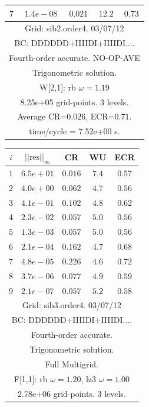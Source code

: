 \begin{table}[hbt]
\begin{center}
{\begin{tabular}{|c|c|c|c|c|}
 $ 7$  & $ 1.4e-08$ & $0.021$ & $12.2$ & $0.73$ \\ 
\hline 
\multicolumn{5}{|c|}{Grid: sib2.order4. 03/07/12}  \\
\multicolumn{5}{|c|}{BC: DDDDDD+IIIIDI+IIIIDI....}  \\
\multicolumn{5}{|c|}{Fourth-order accurate. NO-OP-AVE}  \\
\multicolumn{5}{|c|}{Trigonometric solution.}  \\
\multicolumn{5}{|c|}{W[2,1]: rb $\omega=1.19$}  \\
\multicolumn{5}{|c|}{8.25e+05 grid-points. 3 levels.}  \\
\multicolumn{5}{|c|}{Average CR=$0.026$, ECR=$0.71$.}  \\
\multicolumn{5}{|c|}{time/cycle = 7.52e+00 s.}  \\
\hline 
\end{tabular}
\begin{tabular}{|c|c|c|c|c|} \hline 
 $i$   & $\vert\vert\mbox{res}\vert\vert_\infty$  &  CR     &  WU    & ECR  \\   \hline 
 $ 1$  & $ 6.5e+01$ & $0.016$ & $ 7.4$ & $0.57$ \\ 
 $ 2$  & $ 4.0e+00$ & $0.062$ & $ 4.7$ & $0.56$ \\ 
 $ 3$  & $ 4.1e-01$ & $0.102$ & $ 4.8$ & $0.62$ \\ 
 $ 4$  & $ 2.3e-02$ & $0.057$ & $ 5.0$ & $0.56$ \\ 
 $ 5$  & $ 1.3e-03$ & $0.057$ & $ 5.0$ & $0.56$ \\ 
 $ 6$  & $ 2.1e-04$ & $0.162$ & $ 4.7$ & $0.68$ \\ 
 $ 7$  & $ 4.8e-05$ & $0.226$ & $ 4.6$ & $0.72$ \\ 
 $ 8$  & $ 3.7e-06$ & $0.077$ & $ 4.9$ & $0.59$ \\ 
 $ 9$  & $ 2.1e-07$ & $0.057$ & $ 5.2$ & $0.58$ \\ 
\hline 
\multicolumn{5}{|c|}{Grid: sib3.order4. 03/07/12}  \\
\multicolumn{5}{|c|}{BC: DDDDDD+IIIIDI+IIIIDI....}  \\
\multicolumn{5}{|c|}{Fourth-order accurate.}  \\
\multicolumn{5}{|c|}{Trigonometric solution.}  \\
\multicolumn{5}{|c|}{Full Multigrid.}  \\
\multicolumn{5}{|c|}{F[1,1]: rb $\omega=1.20$, lz3 $\omega=1.00$}  \\
\multicolumn{5}{|c|}{2.78e+06 grid-points. 3 levels.}  \\

\end{tabular}}
\end{center}
\end{table}

